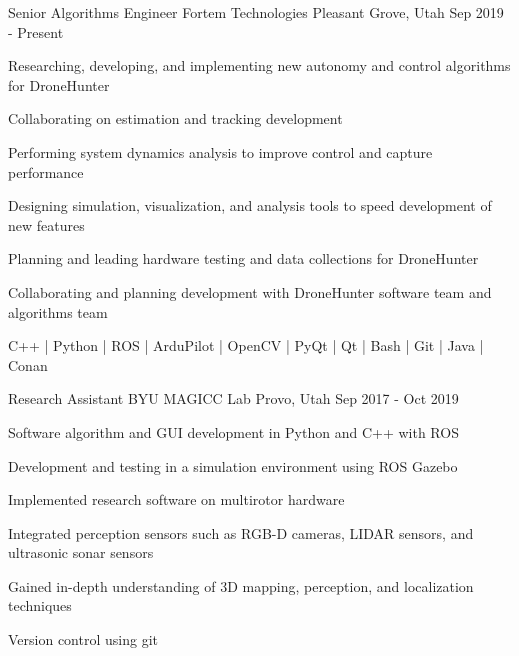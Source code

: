 
\begin{cventries}

\cventry
  {Senior Algorithms Engineer}
  {Fortem Technologies}
  {Pleasant Grove, Utah}
  {Sep 2019 - Present}
  {
    \begin{cvitems}
      \item{Researching, developing, and implementing new autonomy and control algorithms for DroneHunter}
      \item{Collaborating on estimation and tracking development}
      \item{Performing system dynamics analysis to improve control and capture performance}
      \item{Designing simulation, visualization, and analysis tools to speed development of new features}
      \item{Planning and leading hardware testing and data collections for DroneHunter}
      \item{Collaborating and planning development with DroneHunter software team and algorithms team}
      \item{C++ | Python | ROS | ArduPilot | OpenCV | PyQt | Qt | Bash | Git | Java | Conan}
    \end{cvitems}
  }

\cventry
  {Research Assistant} %
  {BYU MAGICC Lab} %
  {Provo, Utah} %
  {Sep 2017 - Oct 2019} %
  {
    \begin{cvitems} %
      \item{Software algorithm and GUI development in Python and C++ with ROS}
      \item{Development and testing in a simulation environment using ROS Gazebo}
      \item{Implemented research software on multirotor hardware}
      \item{Integrated perception sensors such as RGB-D cameras, LIDAR sensors, and ultrasonic sonar sensors}
      \item{Gained in-depth understanding of 3D mapping, perception, and localization techniques}
      \item{Version control using git}
    \end{cvitems}
  }


\end{cventries}
